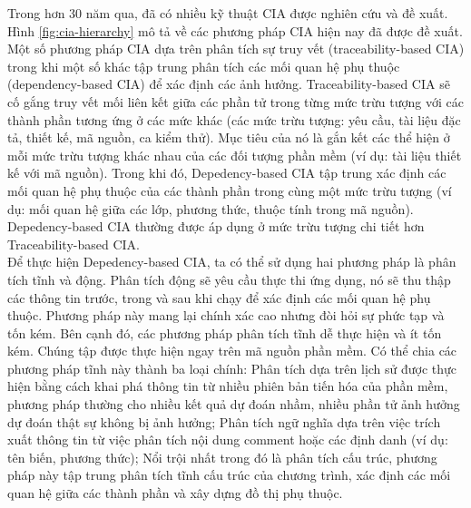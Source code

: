 \documentclass[12pt]{report}
\begin{document}
Trong hơn 30 năm qua, đã có nhiều kỹ thuật CIA được nghiên cứu và đề xuất. Hình \ref{fig:cia-hierarchy} mô tả về các phương pháp CIA hiện nay đã được đề xuất. Một số phương pháp CIA dựa trên phân tích sự truy vết (traceability-based CIA) trong khi một số khác tập trung phân tích các mối quan hệ phụ thuộc (dependency-based CIA) để xác định các ảnh hưởng. Traceability-based CIA sẽ cố gắng truy vết mối liên kết giữa các phần tử trong từng mức trừu tượng với các thành phần tương ứng ở các mức khác (các mức trừu tượng: yêu cầu, tài liệu đặc tả, thiết kế, mã nguồn, ca kiểm thử). Mục tiêu của nó là gắn kết các thể hiện ở mỗi mức trừu tượng khác nhau của các đối tượng phần mềm (ví dụ: tài liệu thiết kế với mã nguồn). Trong khi đó, Depedency-based CIA tập trung xác định các mối quan hệ phụ thuộc của các thành phần trong cùng một mức trừu tượng (ví dụ: mối quan hệ giữa các lớp, phương thức, thuộc tính trong mã nguồn). Depedency-based CIA thường được áp dụng ở mức trừu tượng chi tiết hơn Traceability-based CIA.\\

Để thực hiện Depedency-based CIA, ta có thể sử dụng hai phương pháp là phân tích tĩnh và động. Phân tích động sẽ yêu cầu thực thi ứng dụng, nó sẽ thu thập các thông tin trước, trong và sau khi chạy để xác định các mối quan hệ phụ thuộc. Phương pháp này mang lại chính xác cao nhưng đòi hỏi sự phức tạp và tốn kém. Bên cạnh đó, các phương pháp phân tích tĩnh dễ thực hiện và ít tốn kém. Chúng tập được thực hiện ngay trên mã nguồn phần mềm. Có thể chia các phương pháp tĩnh này thành ba loại chính: Phân tích dựa trên lịch sử được thực hiện bằng cách khai phá thông tin từ nhiều phiên bản tiến hóa của phần mềm, phương pháp thường cho nhiều kết quả dự đoán nhầm, nhiều phần tử ảnh hưởng dự đoán thật sự không bị ảnh hưởng; Phân tích ngữ nghĩa dựa trên việc trích xuất thông tin từ việc phân tích nội dung comment hoặc các định danh (ví dụ: tên biến, phương thức); Nổi trội nhất trong đó là phân tích cấu trúc, phương pháp này tập trung phân tích tĩnh cấu trúc của chương trình, xác định các mối quan hệ giữa các thành phần và xây dựng đồ thị phụ thuộc.\\
\end{document}
